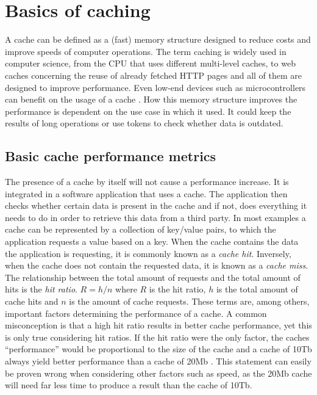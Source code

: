 \documentclass[pdftex,a4paper,12pt,twoside]{report}
\begin{document}
\chapter{Basics of caching}
\label{ch:caching}
A cache can be defined as a (fast) memory structure designed to reduce costs and improve speeds of computer operations.
The term caching is widely used in computer science, from the CPU that uses different multi-level caches, to web caches concerning
the reuse of already fetched HTTP pages \citep{rfc2616} and all of them are designed to improve performance. Even low-end devices such as microcontrollers
can benefit on the usage of a cache \citep{extremetech_multilevelcache}. How this memory structure improves the performance
is dependent on the use case in which it used. It could keep the results of long operations or use tokens to check whether data is outdated.
\section{Basic cache performance metrics}
The presence of a cache by itself will not cause a performance increase. It is integrated in a software application that uses a cache. The application then checks whether certain data is present in the cache and if not, does everything it needs to do in order to retrieve this data from a third party. In most examples a cache can be represented by a collection of key/value pairs, to which the application requests a value based on a key. When the cache contains the data the application is requesting, it is commonly known as a \emph{cache hit}. Inversely, when the cache does not contain the requested data, it is known as a \emph{cache miss}. The relationship between the total amount of requests and the total amount of hits is the \emph{hit ratio}.
$R=h/n$ where $R$ is the hit ratio, $h$ is the total amount of cache hits and $n$ is the amount of cache requests.
These terms are, among others, important factors determining the performance of a cache. A common misconception is that a high hit ratio results in better cache performance, yet this is only true considering hit ratios. If the hit ratio were the only factor, the caches ``performance'' would be proportional to the size of the cache and a cache of 10Tb always yield better performance than a cache of 20Mb \citep{wulf1995hitting}. This statement can easily be proven wrong when considering other factors such as speed, as the 20Mb cache will need far less time to produce a result than the cache of 10Tb.
\end{document}
